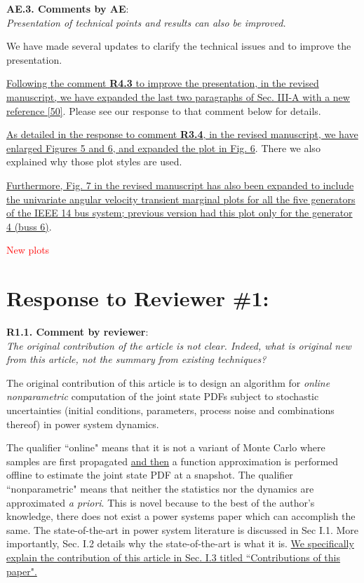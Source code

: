 \documentclass[12pt,onecolumn]{IEEEtran}
\newcommand{\blue}{\color{blue}}
\newcommand{\red}{\textcolor{red}}
\def\spacingset#1{\def\baselinestretch{#1}\small\normalsize}
\newcommand{\nib}{\noindent  {\bf Response:} }
\begin{document}
\noindent
{\bf AE.3. Comments by AE}:\\
{\em Presentation of technical points and results can also be improved.}

{\nib {\blue We have made several updates to clarify the technical issues and to improve the presentation.

\ul{Following the comment \textbf{R4.3} to improve the presentation, in the revised manuscript, we have expanded the last two paragraphs of Sec. III-A with a new reference [50]}. Please see our response to that comment below for details. 

\ul{As detailed in the response to comment \textbf{R3.4}, in the revised manuscript, we have enlarged Figures 5 and 6, and expanded the plot in Fig. 6}. There we also explained why those plot styles are used.

\ul{Furthermore, Fig. 7 in the revised manuscript has also been expanded to include the univariate angular velocity transient marginal plots for all the five generators of the IEEE 14 bus system; previous version had this plot only for the generator 4 (buss 6)}.

{\red{New plots}}
}}





\newpage
\spacingset{1}

\section*{\large \bf Response to Reviewer \#1:}


\noindent
{\bf R1.1. Comment by reviewer}:\\
{\em The original contribution of the article is not clear.  Indeed, what is original new from this article, not the summary from existing techniques?}


{\nib {\blue The original contribution of this article is to design an algorithm for \emph{online nonparametric} computation of the joint state PDFs subject to stochastic uncertainties (initial conditions, parameters, process noise and combinations thereof) in power system dynamics. 

The qualifier ``online" means that it is not a variant of Monte Carlo where samples are first propagated \ul{and then} a function approximation is performed offline to estimate the joint state PDF at a snapshot. The qualifier ``nonparametric" means that neither the statistics nor the dynamics are approximated \emph{a priori}. This is novel because to the best of the author's knowledge, there does not exist a power systems paper which can accomplish the same. The state-of-the-art in power system literature is discussed in Sec I.1. More importantly, Sec. I.2 details why the state-of-the-art is what it is. \ul{We specifically explain the contribution of this article in Sec. I.3 titled ``Contributions of this paper".}
}}
\end{document}
